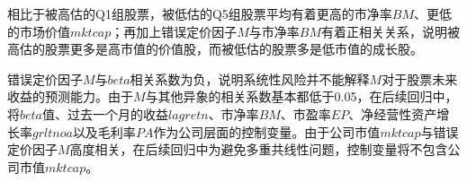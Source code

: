 相比于被高估的Q1组股票，被低估的Q5组股票平均有着更高的市净率$BM$、更低的市场价值$mktcap$；再加上错误定价因子$M$与市净率$BM$有着正相关关系，说明被高估的股票更多是高市值的价值股，而被低估的股票多是低市值的成长股。

错误定价因子$M$与$beta$相关系数为负，说明系统性风险并不能解释$M$对于股票未来收益的预测能力。由于$M$与其他异象的相关系数基本都低于0.05，在后续回归中，将$beta$值、过去一个月的收益$lagretn$、市净率$BM$、市盈率$EP$、净经营性资产增长率$grltnoa$以及毛利率$PA$作为公司层面的控制变量。由于公司市值$mktcap$与错误定价因子$M$高度相关，在后续回归中为避免多重共线性问题，控制变量将不包含公司市值$mktcap$。




%
%
%
%
%
%

